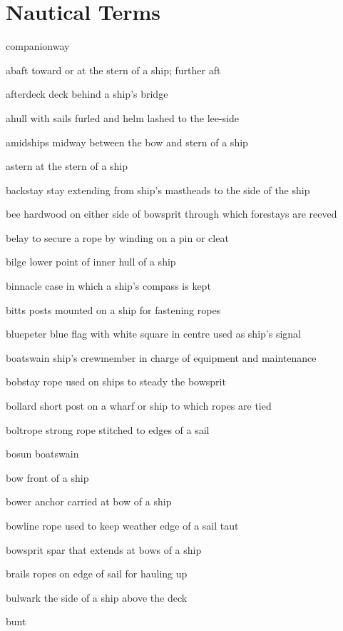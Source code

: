 \documentclass[
  11pt,
  msmallroyalvopaper
]{memoir}
\providecommand{\tightlist}{%
  \setlength{\itemsep}{0pt}\setlength{\parskip}{0pt}}
\begin{document}
\hypertarget{nautical-terms}{%
\chapter{Nautical Terms}\label{nautical-terms}}

\begin{labeling}{companionway}
\tightlist
\item[abaft]
toward or at the stern of a ship; further aft
\item[afterdeck]
deck behind a ship's bridge
\item[ahull]
with sails furled and helm lashed to the lee-side
\item[amidships]
midway between the bow and stern of a ship
\item[astern]
at the stern of a ship
\item[backstay]
stay extending from ship's mastheads to the side of the ship
\item[bee]
hardwood on either side of bowsprit through which forestays are reeved
\item[belay]
to secure a rope by winding on a pin or cleat
\item[bilge]
lower point of inner hull of a ship
\item[binnacle]
case in which a ship's compass is kept
\item[bitts]
posts mounted on a ship for fastening ropes
\item[bluepeter]
blue flag with white square in centre used as ship's signal
\item[boatswain]
ship's crewmember in charge of equipment and maintenance
\item[bobstay]
rope used on ships to steady the bowsprit
\item[bollard]
short post on a wharf or ship to which ropes are tied
\item[boltrope]
strong rope stitched to edges of a sail
\item[bosun]
boatswain
\item[bow]
front of a ship
\item[bower]
anchor carried at bow of a ship
\item[bowline]
rope used to keep weather edge of a sail taut
\item[bowsprit]
spar that extends at bows of a ship
\item[brails]
ropes on edge of sail for hauling up
\item[bulwark]
the side of a ship above the deck
\item[bunt]

\end{labeling}
\end{document}
